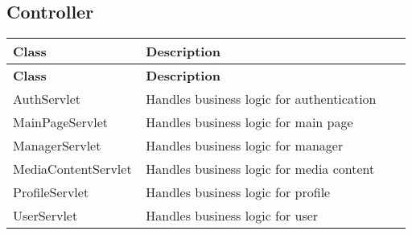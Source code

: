 \subsection*{Controller}
\renewcommand{\arraystretch}{1.5}
\begin{longtable}{|>{\arraybackslash}p{0.33\linewidth}|>{\arraybackslash}p{0.66\linewidth}|}
    \hline
    \textbf{Class} & \textbf{Description} \\
    \hline
    \endfirsthead

    \hline
    \textbf{Class} & \textbf{Description} \\
    \hline
    \endhead

    \hline
    \endfoot

    \hline
    \endlastfoot

    AuthServlet & Handles business logic for authentication \\
    \hline
    MainPageServlet & Handles business logic for main page \\
    \hline
    ManagerServlet & Handles business logic for manager \\
    \hline
    MediaContentServlet & Handles business logic for media content \\
    \hline
    ProfileServlet & Handles business logic for profile \\
    \hline
    UserServlet & Handles business logic for user \\
    \hline
\end{longtable}

\newpage

